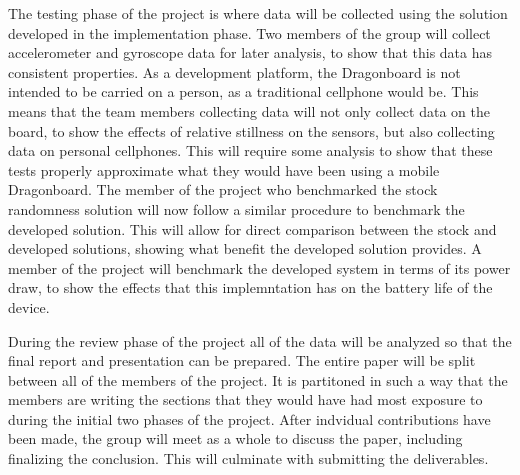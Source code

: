 The testing phase of the project is where data will be collected using the
solution developed in the implementation phase. Two members of the group will
collect accelerometer and gyroscope data for later analysis, to show that this
data has consistent properties. As a development platform, the Dragonboard is
not intended to be carried on a person, as a traditional cellphone would be.
This means that the team members collecting data will not only collect data on
the board, to show the effects of relative stillness on the sensors, but also
collecting data on personal cellphones. This will require some analysis to show
that these tests properly approximate what they would have been using a mobile
Dragonboard. The member of the project who benchmarked the stock randomness
solution will now follow a similar procedure to benchmark the developed
solution. This will allow for direct comparison between the stock and developed
solutions, showing what benefit the developed solution provides. A member of the
project will benchmark the developed system in terms of its power draw, to show
the effects that this implemntation has on the battery life of the device.

During the review phase of the project all of the data will be analyzed so that
the final report and presentation can be prepared. The entire paper will be
split between all of the members of the project. It is partitoned in such a way
that the members are writing the sections that they would have had most exposure
to during the initial two phases of the project. After indvidual contributions
have been made, the group will meet as a whole to discuss the paper, including
finalizing the conclusion. This will culminate with submitting the deliverables.


